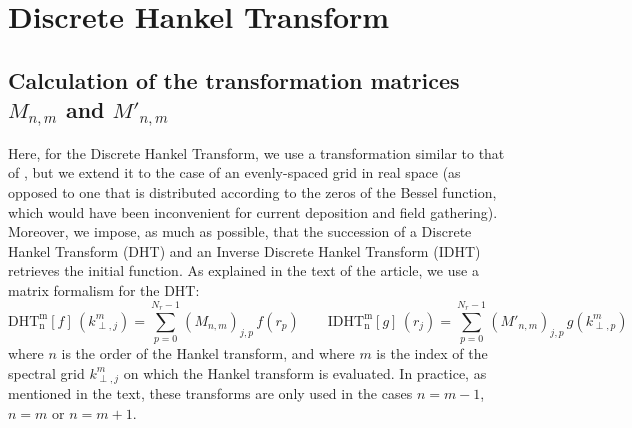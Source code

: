 \section{Discrete Hankel Transform}
\label{sec:HTMatrix}

\subsection{Calculation of the transformation matrices $M_{n,m}$ and $M'_{n,m}$}

Here, for the Discrete Hankel Transform, we use a transformation
similar to that of \cite{Yu,Guizar,KaiMing}, but
we extend it to the case of an evenly-spaced grid in real space (as opposed to one
that is distributed according to the zeros of the Bessel
function, which would have been inconvenient for current deposition
and field gathering). Moreover, we impose, as much as possible, that the
succession of a Discrete Hankel Transform (DHT) and an Inverse Discrete
Hankel Transform (IDHT) retrieves the initial function. As explained in
the text of the article, we use a matrix formalism for the DHT:
\[ \mathrm{DHT^m_n}[f] \,(k^m_{\perp,j}) = \sum_{p=0}^{N_r-1} (M_{n,m})_{j,p}
\,f(r_p) \qquad \mathrm{IDHT^m_n}[g] \, (r_j) = \sum_{p=0}^{N_r-1}
(M'_{n,m})_{j,p} \,g(k^m_{\perp,p}) \]
\noindent where $n$ is the order of the Hankel transform, and where
$m$ is the index of the spectral grid
$k^m_{\perp,j}$ on which the Hankel transform is evaluated. 
In practice, as mentioned in the text, these
transforms are only used in the cases $n=m-1$, $n=m$ or $n=m+1$.


